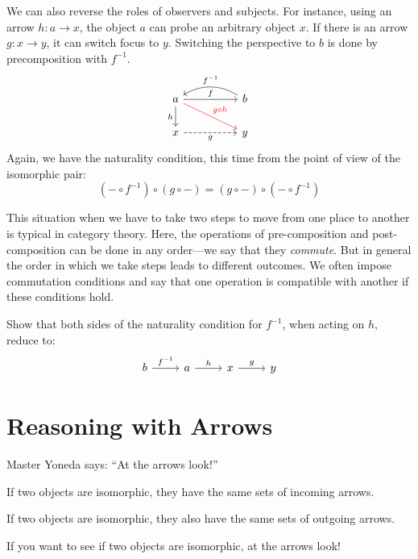 \documentclass[DaoFP]{subfiles}
\begin{document}
We can also reverse the roles of observers and subjects. For instance, using an arrow $h \colon a \to x$, the object $a$ can probe an arbitrary object $x$. If there is an arrow $g \colon x \to y$, it can switch focus to $y$. Switching the perspective to $b$ is done by precomposition with $f^{-1}$.
\[
 \begin{tikzcd}
 a
 \arrow[rr, "f"]
 \arrow[d, "h"']
 \arrow[rrd, red, "g\circ h"]
 && b
  \arrow[ll, bend right,  "f^{-1}"']
 \\
 x
 \arrow[rr, dashed, "g"']
  && y
 \end{tikzcd}
\]
Again, we have the naturality condition, this time from the point of view of the isomorphic pair:
\[(- \circ f^{-1}) \circ (g \circ -) = (g \circ -) \circ (- \circ f^{-1}) \]

This situation when we have to take two steps to move from one place to another is typical in category theory. Here, the operations of pre-composition and post-composition can be done in any order---we say that they \emph{commute}. But in general the order in which we take steps leads to different outcomes. We often impose commutation conditions and say that one operation is compatible with another if these conditions hold.

\begin{exercise}
Show that both sides of the naturality condition for $f^{-1}$, when acting on $h$, reduce to:
\[
 \begin{tikzcd}
 b \arrow[r, "f^{-1}"] &a \arrow[r, "h"] & x \arrow[r, "g"] & y
\end{tikzcd}
\]

\end{exercise}

\section{Reasoning with Arrows}

Master Yoneda says: ``At the arrows look!''

If two objects are isomorphic, they have the same sets of incoming arrows. 

If two objects are isomorphic, they also have the same sets of outgoing arrows.

If you want to see if two objects are isomorphic, at the arrows look!

\medskip
\end{document}
